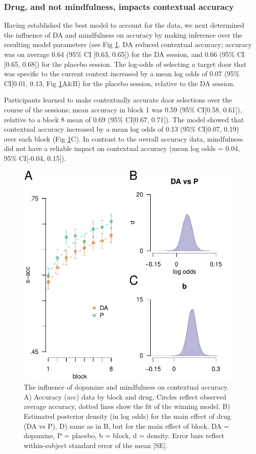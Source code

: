 \documentclass{article}
\begin{document}
\hypertarget{drug-and-not-mindfulness-impacts-contextual-accuracy}{%
\subsubsection{Drug, and not mindfulness, impacts contextual
accuracy}\label{drug-and-not-mindfulness-impacts-contextual-accuracy}}

Having established the best model to account for the data, we next
determined the influence of DA and mindfulness on accuracy by making
inference over the resulting model parameters (see Fig
\ref{fig:caccfig}. DA reduced contextual accuracy; accuracy was on
average 0.64 (95\% CI {[}0.63, 0.65{]}) for the DA session, and 0.66
(95\% CI {[}0.65, 0.68{]}) for the placebo session. The log-odds of
selecting a target door that was specific to the current context
increased by a mean log odds of 0.07 (95\% CI{[}0.01, 0.13, Fig
\ref{fig:caccfig}A\&B) for the placebo session, relative to the DA
session.

Participants learned to make contextually accurate door selections over
the course of the sessions; mean accuracy in block 1 was 0.59 (95\%
CI{[}0.58, 0.61{]}), relative to a block 8 mean of 0.69 (95\% CI{[}0.67,
0.71{]}). The model showed that contextual accuracy increased by a mean
log odds of 0.13 (95\% CI{[}0.07, 0.19) over each block (Fig
\ref{fig:caccfig}C). In contrast to the overall accuracy data,
mindfulness did not have a reliable impact on contextual accuracy (mean
log odds = 0.04, 95\% CI{[}-0.04, 0.15{]}).

\begin{figure}

{\centering \includegraphics[width=0.7\linewidth]{../../images/cacc_fig} 

}

\caption{The influence of dopamine and mindfulness on contextual accuracy. A) Accuracy (acc) data by block and drug. Circles reflect observed average accuracy, dotted lines show the fit of the winning model. B) Estimated posterior density (in log odds) for the main effect of drug (DA vs P), D) same as in B, but for the main effect of block. DA = dopamine, P = placebo, b = block, d = density. Error bars reflect within-subject standard error of the mean [SE].}\label{fig:caccfig}
\end{figure}
\end{document}
